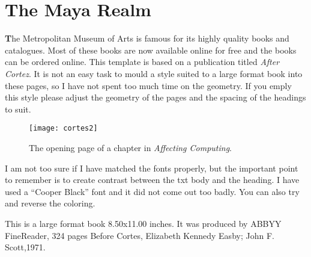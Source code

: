                                  
\chapter[Style 58]{The Maya Realm}
\label{st:58}


{\Huge\cooperup\bfseries\color{maya} T}he Metropolitan Museum of Arts is famous for its highly quality books and catalogues. Most of these books are now available online for free and the books can be ordered online. This template is based on a publication titled \emph{After Cortez}. It is not an easy task to mould a style suited to a large format book into these pages, so I have not spent too much time on the geometry. If you emply this style please adjust the geometry of the pages and the spacing of the headings to suit.

\example 
\medskip
\begin{figure}[ht]
\centering
\hspace*{-.1\textwidth}\texttt{[image: cortes2]}
\caption{The opening page of a chapter in \textit{Affecting Computing}.}
\end{figure}

I am not too sure if I have matched the fonts properly, but the important point to remember is to create contrast
between the txt body and the heading. I have used a “Cooper Black” font and it did not come out too badly.
You can also try and reverse the coloring.

This is a large format book 8.50x11.00 inches. It was produced by ABBYY FineReader, 324 pages Before Cortes, 
Elizabeth Kennedy Easby; John F. Scott,1971.



